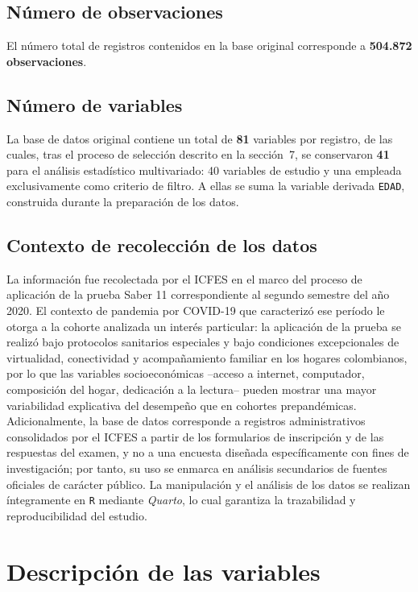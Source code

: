 \documentclass[12pt]{article}
\begin{document}
\subsection{Número de observaciones}
El número total de registros contenidos en la base original corresponde a \textbf{504.872 observaciones}.

\subsection{Número de variables}
La base de datos original contiene un total de \textbf{81} variables por registro, de las cuales, tras el proceso de selección descrito en la sección~7, se conservaron \textbf{41} para el análisis estadístico multivariado: 40 variables de estudio y una empleada exclusivamente como criterio de filtro. A ellas se suma la variable derivada \texttt{EDAD}, construida durante la preparación de los datos.

\subsection{Contexto de recolección de los datos}
La información fue recolectada por el ICFES en el marco del proceso de aplicación de la prueba Saber 11 correspondiente al segundo semestre del año 2020. El contexto de pandemia por COVID-19 que caracterizó ese período le otorga a la cohorte analizada un interés particular: la aplicación de la prueba se realizó bajo protocolos sanitarios especiales y bajo condiciones excepcionales de virtualidad, conectividad y acompañamiento familiar en los hogares colombianos, por lo que las variables socioeconómicas --acceso a internet, computador, composición del hogar, dedicación a la lectura-- pueden mostrar una mayor variabilidad explicativa del desempeño que en cohortes prepandémicas. Adicionalmente, la base de datos corresponde a registros administrativos consolidados por el ICFES a partir de los formularios de inscripción y de las respuestas del examen, y no a una encuesta diseñada específicamente con fines de investigación; por tanto, su uso se enmarca en análisis secundarios de fuentes oficiales de carácter público. La manipulación y el análisis de los datos se realizan íntegramente en \texttt{R} mediante \textit{Quarto}, lo cual garantiza la trazabilidad y reproducibilidad del estudio.

\section{Descripción de las variables}
\end{document}
